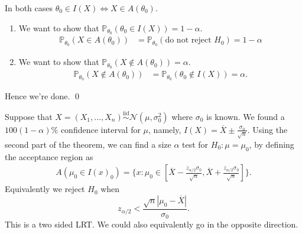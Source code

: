 \documentclass{article}
\newcommand{\iid}{\overset{\text{iid}}{\sim}}
\begin{document}
\pf In both cases $ \theta_0\in I(X)\iff X\in A(\theta_0) $.
\begin{enumerate}
\item We want to show that $ \mathbb P_{\theta_0}(\theta_0 \in I(X)) = 1-\alpha $.
	\begin{align*}
		\mathbb P_{\theta_0}(X\in A(\theta_0)) &= \mathbb P_{\theta_0}(\text{do not reject } H_0) = 1-\alpha
	\end{align*}
\item We want to show that $ \mathbb P_{\theta_0}(X\notin A(\theta_0)) = \alpha $.
	\begin{align*}
		\mathbb P_{\theta_0} (X\notin A(\theta_0)) &= \mathbb P_{\theta_0}(\theta_0 \notin I(X)) =\alpha.
	\end{align*}
\end{enumerate}
Hence we're done. \qed
\par
Suppose that $ X=(X_1,\dots, X_n)\iid \mathcal N(\mu ,\sigma_0^2) $ where $ \sigma_0 $ is known. We found a $ 100(1-\alpha)\% $ confidence interval for $ \mu $, namely, $ I(X)=\overline X \pm \frac{\sigma_0}{\sqrt n} $. Using the second part of the theorem, we can find a size $ \alpha $ test for $ H_0: \mu = \mu_0 $, by defining the acceptance region as
\begin{align*}
	A(\mu_0 \in I(x)_0) = \{x: \mu_0\in \left[\overline X - \frac{z_{\alpha/2} \sigma_0}{\sqrt n}, \overline X + \frac{z_{\alpha/2} \sigma_0}{\sqrt n}\right]\}.
\end{align*}
Equivalently we reject $ H_0 $ when
\[
	z_{\alpha/2} < \frac{\sqrt n |\mu_0 - \overline X|}{\sigma_0}.
\]
This is a two sided LRT. We could also equivalently go in the opposite direction.\par
\end{document}
